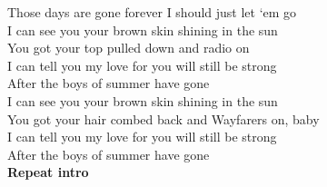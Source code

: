  Those days are gone forever I should just let ‘em go \\
 I can see you  your brown skin shining in the sun\\
You got your top pulled down and  radio on\\
 I can tell you my  love for you will still be strong\\
After the boys of  summer have gone\\
 I can see you  your brown skin shining in the sun\\
You got your hair combed back and  Wayfarers on, baby\\
 I can tell you my  love for you will still be strong\\
After the boys of  summer have gone\\
\textbf{Repeat intro} 

